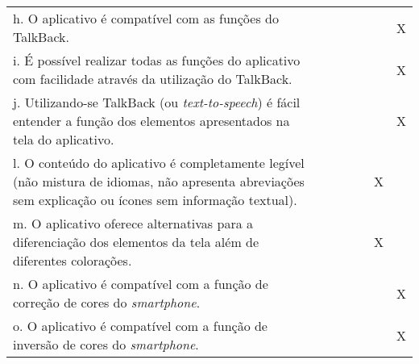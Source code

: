 \documentclass[portuguese,oneside]{tcc}
\begin{document}
\begin{center}
\begin{longtabu}{|L{25em}|c|c|c|c|c|c|}
																																h. O aplicativo é compatível com as funções do TalkBack. & & & & & & X \\ 
																																i. É possível realizar todas as funções do aplicativo com facilidade através da utilização do TalkBack.	& & & & & & X \\ 
																																j. Utilizando-se TalkBack (ou \emph{text-to-speech}) é fácil entender a função dos elementos apresentados na tela do aplicativo. & & & & & & X \\ 
																																l. O conteúdo do aplicativo é completamente legível (não mistura de idiomas, não apresenta abreviações sem explicação ou ícones sem informação textual). & & & & & X & \\ 
																																m. O aplicativo oferece alternativas para a diferenciação dos elementos da tela além de diferentes colorações. & & & & & X & \\ 
																																n. O aplicativo é compatível com a função de correção de cores do \emph{smartphone}. & & & & & & X \\ 
																																o. O aplicativo é compatível com a função de inversão de cores do \emph{smartphone}. & & & & & & X \\ 
																															\end{longtabu}
																														\end{center}
																														
\end{document}
